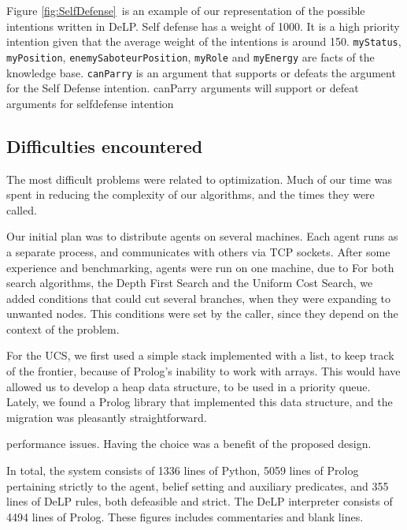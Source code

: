     Figure \ref{fig:SelfDefense}\ is an example of our representation of the
    possible intentions written in DeLP.  Self defense has a weight of 1000. It
    is a high priority intention given that the average weight of the intentions
    is around 150.  \texttt{myStatus}, \texttt{myPosition},
    \texttt{enemySaboteurPosition}, \texttt{myRole} and \texttt{myEnergy} are
    facts of the knowledge base. \texttt{canParry} is an argument that supports
    or defeats the argument for the Self Defense intention.    
    canParry arguments will support or defeat arguments for selfdefense intention

\subsection{Difficulties encountered}
    The most difficult problems were related to optimization. Much of our time was 
    spent in reducing the complexity of our algorithms, and the times they 
    were called.

    Our initial plan was to distribute agents on several machines. Each agent runs 
    as a separate process, and communicates with others via TCP sockets. After 
    some experience and benchmarking, agents were run on one machine, due to 
    For both search algorithms, the Depth First Search and the Uniform Cost 
    Search, we added conditions that could cut several branches, when they were 
    expanding to unwanted nodes. This conditions were set by the caller, since 
    they depend on the context of the problem.

    For the UCS, we first used a simple stack implemented with a list, to keep 
    track of the frontier, because of Prolog's inability to work with arrays. This 
    would have allowed us to develop a heap data structure, to be used in a 
    priority queue. Lately, we found a Prolog library that implemented this data 
    structure, and the migration was pleasantly straightforward.

    performance issues. 
    Having the choice was a benefit of the proposed design.

In total, the system consists of 1336 lines of Python, 5059 lines of Prolog
pertaining strictly to the agent, belief setting and auxiliary predicates, and
355 lines of DeLP rules, both defeasible and strict.  The DeLP interpreter
consists of 4494 lines of Prolog. These figures includes commentaries and blank
lines. 

